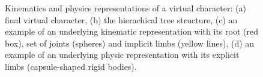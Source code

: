 \begin{figure}
	\begin{center}
	\end{center}
	\vspace{-0.5cm}
	\caption[Kinematics and physics representations of a virtual character]{Kinematics and physics representations of a virtual character: (a) final virtual character, (b) the hierachical tree structure, (c) an example of an underlying kinematic representation with its root (red box), set of joints (spheres) and implicit limbs (yellow lines), (d) an example of an underlying physic representation with its explicit limbs (capsule-shaped rigid bodies).}
	\label{fig:kinDynModels}
\end{figure}


